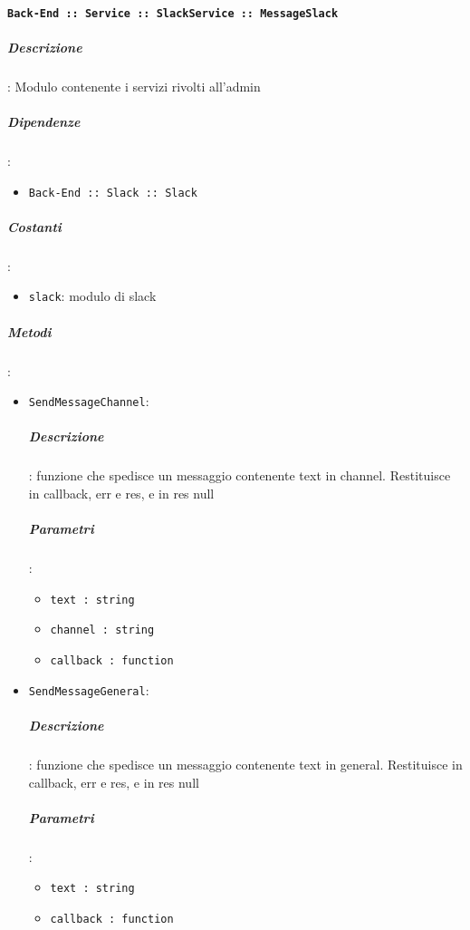 \documentclass[../DefinizioneDiProdotto_v2.0.0.tex]{subfiles}
\begin{document}
\paragraph{\texttt{Back-End :: Service :: SlackService :: MessageSlack}}
\subparagraph{Descrizione}: Modulo contenente i servizi rivolti all'admin
\subparagraph{Dipendenze}:
\begin{itemize}
	\item \texttt{Back-End :: Slack :: Slack}
\end{itemize}
\subparagraph{Costanti}:
\begin{itemize}
	\item \texttt{slack}: modulo di slack
\end{itemize}
\subparagraph{Metodi}:\begin{itemize}
\item \texttt{SendMessageChannel}:
\subparagraph{Descrizione}: funzione che spedisce un messaggio contenente text in channel. Restituisce in callback, err e res, e in res null
\subparagraph{Parametri}: \begin{itemize}
\item \texttt{text : string}
\item \texttt{channel : string}
\item \texttt{callback : function}
\end{itemize}
\item \texttt{SendMessageGeneral}:
\subparagraph{Descrizione}: funzione che spedisce un messaggio contenente text in general. Restituisce in callback, err e res, e in res null
\subparagraph{Parametri}: \begin{itemize}
\item \texttt{text : string}
\item \texttt{callback : function}
\end{itemize}
\end{itemize}

\newpage
\end{document}
